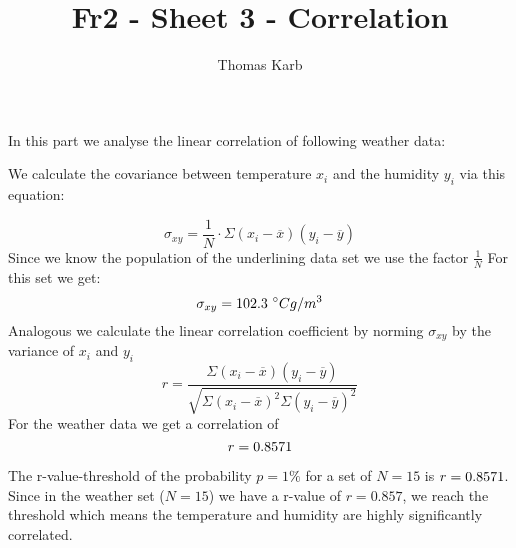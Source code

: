 \documentclass[11pt]{article}
\begin{document}
    \title{Fr2 - Sheet 3 - Correlation}
    \author{Thomas Karb}


    \maketitle

    \section{}
    In this part we analyse the linear correlation of following weather data:
    
    
    
    We calculate the covariance between temperature $x_i$ and the humidity $y_i$ via this equation:
    
    \begin{equation}
        \sigma_{xy} =\frac{1}{N} \cdot \Sigma (x_i - \overline{x}) (y_i - \overline{y})
    \end{equation}
    Since we know the population of the underlining data set we use the factor $\frac{1}{N}$
    For this set we get:
    \begin{equation*}
        \sigma_{xy} = 102.3\ ^{\circ} C g / m^3
    \end{equation*}
    Analogous we calculate the linear correlation coefficient by norming $\sigma_{xy}$ by the variance of $x_i$ and $y_i$
    \begin{equation}
        r = \frac{\Sigma (x_i - \overline{x}) (y_i - \overline{y})}{\sqrt {\Sigma (x_i - \overline{x})^2 \Sigma (y_i - \overline{y})^2}}
    \end{equation}
    For the weather data we get a correlation of
    \begin{equation*}
        r = 0.8571
    \end{equation*}
    
    The r-value-threshold of the probability $p = 1\%$ for a set of $N = 15$  is $r = 0.8571$.
    Since in the weather set ($N = 15$) we have a r-value of $r = 0.857$, we reach the threshold which means 
    the temperature and humidity are highly significantly correlated.
    
\end{document}
